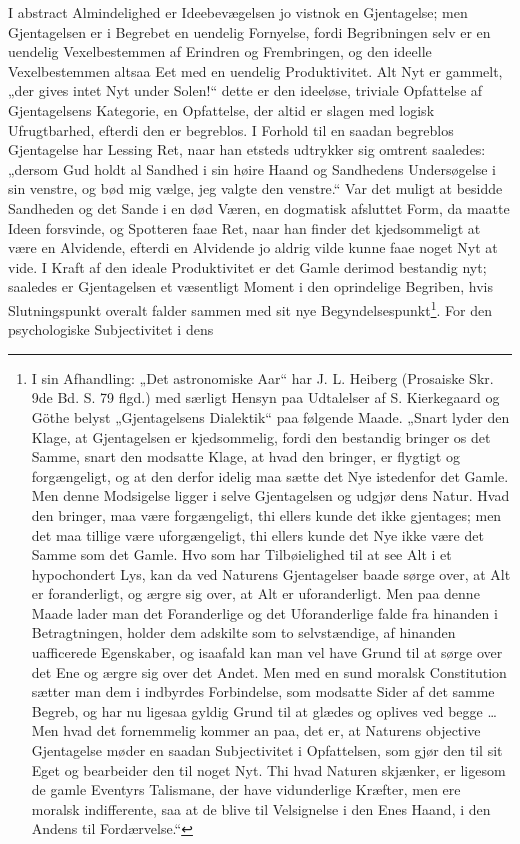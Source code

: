 \documentclass[11pt]{book}
\newcommand{\opage}[1]{\marginnote{\footnotesize\textit{[#1]}}}
\begin{document}
I abstract Almindelighed er Ideebevægelsen jo vistnok en Gjentagelse;
men Gjentagelsen er i Begrebet en uendelig Fornyelse, fordi
Begribningen selv er en uendelig Vexelbestemmen af Erindren og
Frembringen, og den ideelle Vexelbestemmen altsaa Eet med en uendelig
Produktivitet. Alt Nyt er gammelt, „der gives intet Nyt under Solen!“
dette er den ideeløse, triviale Opfattelse af Gjentagelsens Kategorie,
en Opfattelse, der altid er slagen med logisk Ufrugtbarhed, efterdi den
er begreblos. I Forhold til en saadan begreblos Gjentagelse har Lessing
Ret, naar han etsteds udtrykker sig omtrent saaledes: „dersom Gud holdt
al Sandhed i sin høire Haand og Sandhedens Undersøgelse i sin venstre,
og bød mig vælge, jeg valgte den venstre.“ Var det muligt at besidde
Sandheden og det Sande i en død Væren, en dogmatisk afsluttet Form, da
maatte Ideen forsvinde, og Spotteren faae
\opage{192} \setcounter{footnote}{0}%
Ret, naar han finder det kjedsommeligt at være en Alvidende, efterdi en
Alvidende jo aldrig vilde kunne faae noget Nyt at vide. I Kraft af den
ideale Produktivitet er det Gamle derimod bestandig nyt; saaledes er
Gjentagelsen et væsentligt Moment i den oprindelige Begriben, hvis
Slutningspunkt overalt falder sammen med sit nye
Begyndelsespunkt\footnote{%
I sin Afhandling: „Det astronomiske Aar“ har J. L. Heiberg (Prosaiske
Skr. 9de Bd. S. 79 flgd.) med særligt Hensyn paa Udtalelser af
S. Kierkegaard og Göthe belyst „Gjentagelsens Dialektik“ paa følgende
Maade. „Snart lyder den Klage, at Gjentagelsen er kjedsommelig, fordi
den bestandig bringer os det Samme, snart den modsatte Klage, at hvad
den bringer, er flygtigt og forgængeligt, og at den derfor idelig maa
sætte det Nye istedenfor det Gamle. Men denne Modsigelse ligger i selve
Gjentagelsen og udgjør dens Natur. Hvad den bringer, maa være
forgængeligt, thi ellers kunde det ikke gjentages; men det maa tillige
være uforgængeligt, thi ellers kunde det Nye ikke være det Samme som
det Gamle. Hvo som har Tilbøielighed til at see Alt i et hypochondert
Lys, kan da ved Naturens Gjentagelser baade sørge over, at Alt er
foranderligt, og ærgre sig over, at Alt er uforanderligt. Men paa denne
Maade lader man det Foranderlige og det Uforanderlige falde fra
hinanden i Betragtningen, holder dem adskilte som to selvstændige, af
hinanden uafficerede Egenskaber, og isaafald kan man vel have Grund til
at sørge over det Ene og ærgre sig over det Andet. Men med en sund
moralsk Constitution sætter man dem i indbyrdes Forbindelse, som
modsatte Sider af det samme Begreb, og har nu ligesaa gyldig Grund til
at glædes og oplives ved begge \dots{} Men hvad det fornemmelig kommer
an paa, det er, at Naturens objective Gjentagelse møder en saadan
Subjectivitet i Opfattelsen, som gjør den til sit Eget og bearbeider
den til noget Nyt. Thi hvad Naturen skjænker, er ligesom de gamle
Eventyrs Talismane, der have vidunderlige Kræfter, men ere moralsk
indifferente, saa at de blive til Velsignelse i den Enes Haand, i den
Andens til Fordærvelse.“}. For den psychologiske Subjectivitet i dens
\end{document}
